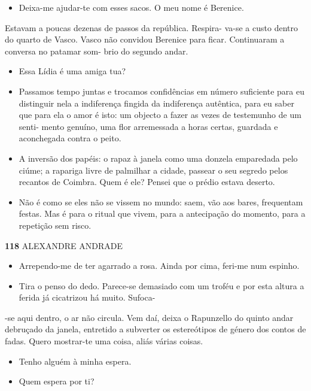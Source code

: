 \begin{itemize}
\tightlist
\item
  Deixa-me ajudar-te com esses sacos. O meu nome é Berenice.
\end{itemize}

Estavam a poucas dezenas de passos da república. Respira- va-se a custo
dentro do quarto de Vasco. Vasco não convidou Berenice para ficar.
Continuaram a conversa no patamar som- brio do segundo andar.

\begin{itemize}
\tightlist
\item
  Essa Lídia é uma amiga tua?
\item
  Passamos tempo juntas e trocamos confidências em número suficiente
  para eu distinguir nela a indiferença fingida da indiferença
  autêntica, para eu saber que para ela o amor é isto: um objecto a
  fazer as vezes de testemunho de um senti- mento genuíno, uma flor
  arremessada a horas certas, guardada e aconchegada contra o peito.
\item
  A inversão dos papéis: o rapaz à janela como uma donzela emparedada
  pelo ciúme; a rapariga livre de palmilhar a cidade, passear o seu
  segredo pelos recantos de Coimbra. Quem é ele? Pensei que o prédio
  estava deserto.
\item
  Não é como se eles não se vissem no mundo: saem, vão aos bares,
  frequentam festas. Mas é para o ritual que vivem, para a antecipação
  do momento, para a repetição sem risco.
\end{itemize}

\textbf{118 }ALEXANDRE ANDRADE

\begin{itemize}
\tightlist
\item
  Arrependo-me de ter agarrado a rosa. Ainda por cima, feri-me num
  espinho.
\item
  Tira o penso do dedo. Parece-se demasiado com um troféu e por esta
  altura a ferida já cicatrizou há muito. Sufoca-
\end{itemize}

-se aqui dentro, o ar não circula. Vem daí, deixa o Rapunzello do quinto
andar debruçado da janela, entretido a subverter os estereótipos de
género dos contos de fadas. Quero mostrar-te uma coisa, aliás várias
coisas.

\begin{itemize}
\tightlist
\item
  Tenho alguém à minha espera.
\item
  Quem espera por ti?
\end{itemize}

